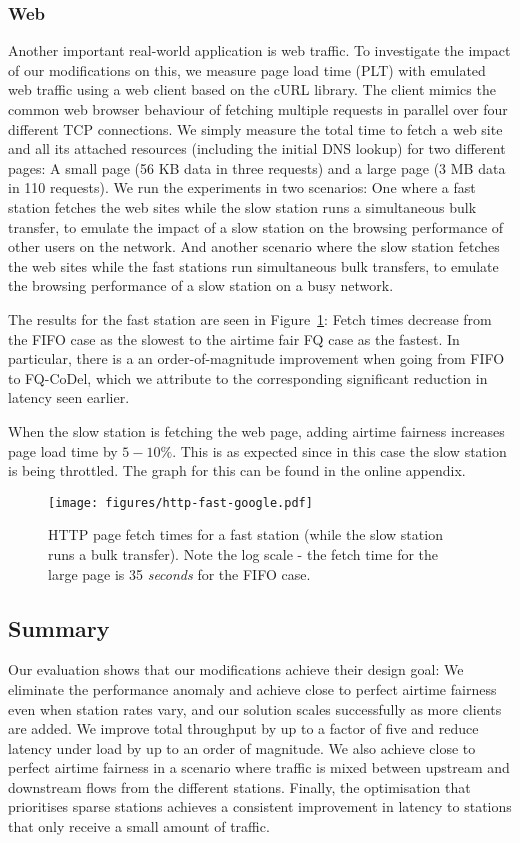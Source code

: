 \documentclass[english]{scrartcl}
\begin{document}
\subsubsection{Web}
\label{sec:orgbf421cc}
Another important real-world application is web traffic. To investigate the
impact of our modifications on this, we measure page load time (PLT) with
emulated web traffic using a web client based on the cURL library. The client
mimics the common web browser behaviour of fetching multiple requests in
parallel over four different TCP connections. We simply measure the total time
to fetch a web site and all its attached resources (including the initial DNS
lookup) for two different pages: A small page (56 KB data in three requests) and
a large page (3 MB data in 110 requests). We run the experiments in two
scenarios: One where a fast station fetches the web sites while the slow station
runs a simultaneous bulk transfer, to emulate the impact of a slow station on
the browsing performance of other users on the network. And another scenario
where the slow station fetches the web sites while the fast stations run
simultaneous bulk transfers, to emulate the browsing performance of a slow
station on a busy network.

The results for the fast station are seen in Figure \ref{fig:http-fast}: Fetch times
decrease from the FIFO case as the slowest to the airtime fair FQ case as the
fastest. In particular, there is a an order-of-magnitude improvement when going
from FIFO to FQ-CoDel, which we attribute to the corresponding significant
reduction in latency seen earlier.

When the slow station is fetching the web page, adding airtime fairness
increases page load time by \(5-10\%\). This is as expected since in this case the
slow station is being throttled. The graph for this can be found in the online
appendix.

\begin{figure}[h]
\centering
\texttt{[image: figures/http-fast-google.pdf]}
\caption{\label{fig:http-fast}
HTTP page fetch times for a fast station (while the slow station runs a bulk transfer).  Note the log scale - the fetch time for the large page is 35 \emph{seconds} for the FIFO case.}
\end{figure}

\subsection{Summary}
\label{sec:orgbf02056}
Our evaluation shows that our modifications achieve their design goal: We
eliminate the performance anomaly and achieve close to perfect airtime fairness
even when station rates vary, and our solution scales successfully as more
clients are added. We improve total throughput by up to a factor of five and
reduce latency under load by up to an order of magnitude. We also achieve close
to perfect airtime fairness in a scenario where traffic is mixed between
upstream and downstream flows from the different stations. Finally, the
optimisation that prioritises sparse stations achieves a consistent improvement
in latency to stations that only receive a small amount of traffic.
\end{document}
